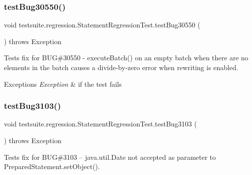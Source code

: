 \subsubsection{\texorpdfstring{test\+Bug30550()}{testBug30550()}}
{\footnotesize\ttfamily void testsuite.\+regression.\+Statement\+Regression\+Test.\+test\+Bug30550 (\begin{DoxyParamCaption}{ }\end{DoxyParamCaption}) throws Exception}

Tests fix for B\+UG\#30550 -\/ execute\+Batch() on an empty batch when there are no elements in the batch causes a divide-\/by-\/zero error when rewriting is enabled.


\begin{DoxyExceptions}{Exceptions}
{\em Exception} & if the test fails \\
\hline
\end{DoxyExceptions}
\mbox{\label{classtestsuite_1_1regression_1_1_statement_regression_test_a9c642be3e679b82dbf2a033e2f09e90b}} 
\subsubsection{\texorpdfstring{test\+Bug3103()}{testBug3103()}}
{\footnotesize\ttfamily void testsuite.\+regression.\+Statement\+Regression\+Test.\+test\+Bug3103 (\begin{DoxyParamCaption}{ }\end{DoxyParamCaption}) throws Exception}

Tests fix for B\+UG\#3103 -- java.\+util.\+Date not accepted as parameter to Prepared\+Statement.\+set\+Object().



